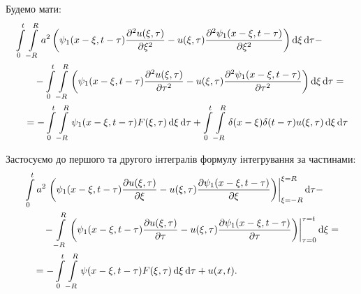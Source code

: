 Будемо мати:
\begin{equation}
	\begin{aligned}
		& \Int_0^t \Int_{-R}^R a^2 \left( \psi_1(x - \xi, t - \tau) \frac{\partial^2 u(\xi, \tau)}{\partial \xi^2} - u(\xi, \tau) \frac{\partial^2 \psi_1(x - \xi, t - \tau)}{\partial \xi^2}\right) \diff \xi \diff \tau - \\
		& \qquad - \Int_0^t \Int_{-R}^R \left( \psi_1(x - \xi, t - \tau) \frac{\partial^2 u(\xi, \tau)}{\partial \tau^2} - u(\xi, \tau) \frac{\partial^2 \psi_1(x - \xi, t - \tau)}{\partial \tau^2}\right) \diff \xi \diff \tau = \\
		& \quad = - \Int_0^t \Int_{-R}^R \psi_1(x - \xi, t - \tau) F(\xi, \tau) \diff \xi \diff \tau + \Int_0^t \Int_{-R}^R \delta(x - \xi) \delta(t - \tau) u(\xi, \tau) \diff \xi \diff \tau
	\end{aligned}
\end{equation}


Застосуємо до першого та другого інтегралів формулу інтегрування за частинами:
\begin{equation}
	\begin{aligned}
		& \displaystyle\int\limits_0^t a^2 \left. \left( \psi_1(x - \xi, t - \tau) \frac{\partial u(\xi, \tau)}{\partial \xi} - u(\xi, \tau) \frac{\partial \psi_1(x - \xi, t - \tau)}{\partial \xi}\right) \right|_{\xi = -R}^{\xi = R} \mathop{}\!\mathrm{d} \tau - \\
		& \qquad - \displaystyle\int\limits_{-R}^R \left. \left( \psi_1(x - \xi, t - \tau) \frac{\partial u(\xi, \tau)}{\partial \tau} - u(\xi, \tau) \frac{\partial \psi_1(x - \xi, t - \tau)}{\partial \tau}\right) \right|_{\tau = 0}^{\tau = t} \mathop{}\!\mathrm{d} \xi = \\
		& \quad = - \displaystyle\int\limits_0^t \displaystyle\int\limits_{-R}^R \psi(x - \xi, t - \tau) F(\xi, \tau) \mathop{}\!\mathrm{d} \xi \mathop{}\!\mathrm{d} \tau + u(x, t).
	\end{aligned}
\end{equation}


